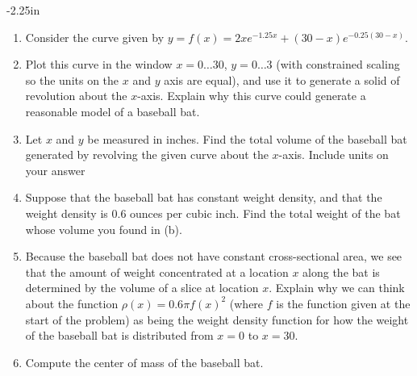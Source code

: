 \begin{adjustwidth*}{}{-2.25in}
\begin{multicols*}{2}
\begin{enumerate}[1),resume]
  \item Consider the curve given by $y = f(x) = 2xe^{-1.25x} + (30-x) e^{-0.25(30-x)}$.
  \ba
  	\item Plot this curve in the window $x = 0 \ldots 30$, $y = 0 \ldots 3$ (with constrained scaling so the units on the $x$ and $y$ axis are equal), and use it to generate a solid of revolution about the $x$-axis.  Explain why this curve could generate a reasonable model of a baseball bat.
	\item Let $x$ and $y$ be measured in inches.  Find the total volume of the baseball bat generated by revolving the given curve about the $x$-axis.  Include units on your answer
	\item Suppose that the baseball bat has constant weight density, and that the weight density is 0.6 ounces per cubic inch.  Find the total weight of the bat whose volume you found in (b).
	\item Because the baseball bat does not have constant cross-sectional area, we see that the amount of weight concentrated at a location $x$ along the bat is determined by the volume of a slice at location $x$.  Explain why we can think about the function $\rho(x) = 0.6 \pi f(x)^2$ (where $f$ is the function given at the start of the problem) as being the weight density function for how the weight of the baseball bat is distributed from $x = 0$ to $x = 30$.
	\item Compute the center of mass of the baseball bat.  
  \ea
\end{enumerate}

\end{multicols*}
\end{adjustwidth*}

%
%
%
%

\afterexercises